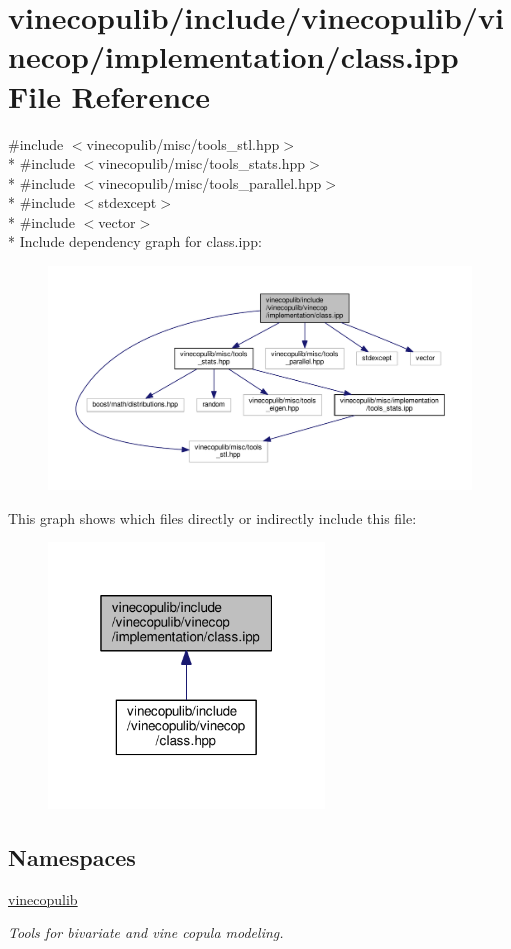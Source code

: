 \hypertarget{vinecop_2implementation_2class_8ipp}{}\section{vinecopulib/include/vinecopulib/vinecop/implementation/class.ipp File Reference}
\label{vinecop_2implementation_2class_8ipp}
{\ttfamily \#include $<$vinecopulib/misc/tools\+\_\+stl.\+hpp$>$}\\*
{\ttfamily \#include $<$vinecopulib/misc/tools\+\_\+stats.\+hpp$>$}\\*
{\ttfamily \#include $<$vinecopulib/misc/tools\+\_\+parallel.\+hpp$>$}\\*
{\ttfamily \#include $<$stdexcept$>$}\\*
{\ttfamily \#include $<$vector$>$}\\*
Include dependency graph for class.\+ipp\+:\nopagebreak
\begin{figure}[H]
\begin{center}
\leavevmode
\includegraphics[width=350pt]{vinecop_2implementation_2class_8ipp__incl}
\end{center}
\end{figure}
This graph shows which files directly or indirectly include this file\+:\nopagebreak
\begin{figure}[H]
\begin{center}
\leavevmode
\includegraphics[width=208pt]{vinecop_2implementation_2class_8ipp__dep__incl}
\end{center}
\end{figure}
\subsection*{Namespaces}
\begin{DoxyCompactItemize}
\item 
 \hyperlink{namespacevinecopulib}{vinecopulib}
\begin{DoxyCompactList}\small\item\em Tools for bivariate and vine copula modeling. \end{DoxyCompactList}\end{DoxyCompactItemize}
